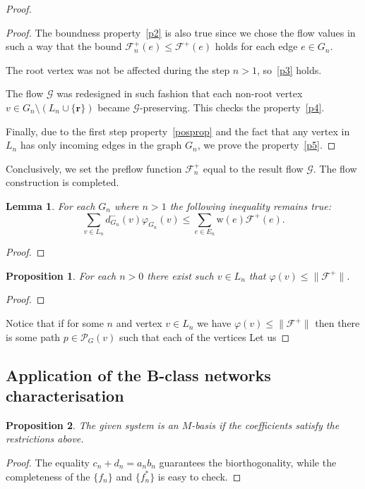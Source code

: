 \documentclass[12pt]{article}
\renewcommand{\cal}[1]{\mathcal{#1}}
\renewcommand{\leq}{\leqslant}
\renewcommand{\phi}{\varphi}
\newtheorem{prop}{Proposition}
\newtheorem{lemma}{Lemma}
\theoremstyle{definition}
\newcommand{\wt}{\mathrm{w}}
\newcommand{\flowpos}{\mathcal{F}^{+}}
\newcommand{\flowposn}[1]{\mathcal{F}_{#1}^{+}}
\renewcommand{\root}{\mathbf{r}}
\newcommand{\gpaths}{\cal{P}_{G}}
\numberwithin{remark}{section}
\numberwithin{theorem}{section}
\numberwithin{prop}{section}
\numberwithin{equation}{section}
\numberwithin{lemma}{section}
\numberwithin{prop_under_lemma}{lemma}
\begin{document}
\begin{proof}
\begin{proof}
        The boundness property~\ref{p2} is also true since we chose the flow values in such a way
          that the bound $\flowposn{n}(e) \leq \flowpos(e)$ holds for each edge $e\in G_n$.

        The root vertex was not be affected during the step $n > 1$, so~\ref{p3} holds.

        The flow $\cal{G}$ was redesigned in such fashion that each non-root vertex $v \in G_{n} \setminus 
          \left(L_n \cup \{\root\}\right)$ became $\cal{G}$-preserving.
        This checks the property~\ref{p4}.
        
        Finally, due to the first step property~\ref{posprop} and the fact that
        any vertex in $L_n$ has only incoming edges in the graph $G_n$, we prove the property~\ref{p5}.
      \end{proof}
      Conclusively, we set the preflow function $\flowposn{n}$ equal to the result flow $\cal{G}$.
      The flow construction is completed.
      \begin{lemma}
        For each $G_n$ where $n > 1$ the following inequality remains true:
        \[
          \sum_{v\in L_n}d_{G_n}^{-}(v) \phi_{G_n}(v) \leq \sum_{e \in E_n} \wt(e) \flowpos(e).
        \]
      \end{lemma}
      \begin{proof}
      \end{proof}
      \begin{prop}
        For each $n > 0$ there exist such $v \in L_n$ that $\phi(v) \leq \|\flowpos\|$.
      \end{prop}
      \begin{proof}
      \end{proof}
      Notice that if for some $n$ and vertex $v \in L_n$ we have $\phi(v) \leq \|\flowpos\|$
      then there is some path $p \in \gpaths(v)$ such that each of the vertices
      Let us 
    \end{proof}
    \subsection{Application of the B-class networks characterisation}
    \pagebreak
    \begin{prop}
        The given system is an $M$-basis if the coefficients satisfy the restrictions above.
    \end{prop}
    \begin{proof}
        The equality $c_n + d_n = a_n b_n$ guarantees the bi\-orthogonality,
        while the completeness of the $\{f_n\}$ and $\{f_n^*\}$ is
        easy to check.
    \end{proof}
    
\end{document}
